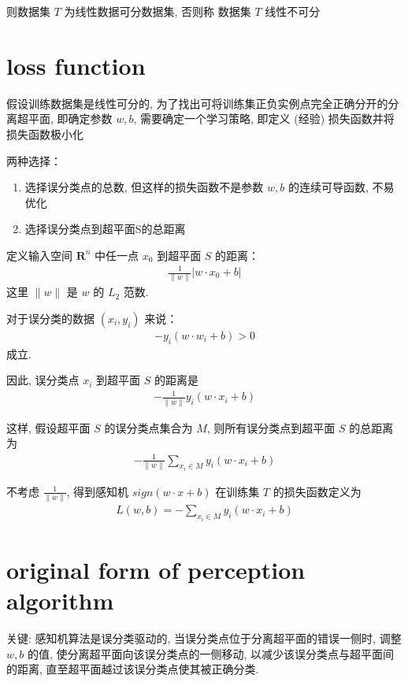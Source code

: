 \documentclass[oneside, 12pt]{ctexbook}
\begin{document}
			则数据集 $T$ 为线性数据可分数据集, 否则称 数据集 $T$ 线性不可分
	
		\section{\quad loss function}
			假设训练数据集是线性可分的, 为了找出可将训练集正负实例点完全正确分开的分离超平面, 即确定参数 $w, b$, 需要确定一个学习策略, 即定义 (经验) 损失函数并将损失函数极小化 
			
			两种选择：
			\begin{enumerate}
				\item 选择误分类点的总数, 但这样的损失函数不是参数 $w, b$ 的连续可导函数, 不易优化
				
				\item 选择误分类点到超平面S的总距离
			\end{enumerate}
		
			定义输入空间 $\boldsymbol{\text{R}}^n$ 中任一点 $x_0$ 到超平面 $S$ 的距离：
				\begin{align}
					\frac{1}{\parallel w \parallel} |w \cdot x_0 + b|
				\end{align}
			这里 $\parallel w \parallel$ 是 $w$ 的 $L_2$ 范数.
			
			对于误分类的数据 $(x_i, y_i)$ 来说：
				\begin{align}
					-y_i(w \cdot w_i + b) > 0
				\end{align}
			成立. 
			
			因此, 误分类点 $x_i$ 到超平面 $S$ 的距离是
				\begin{align}
					-\frac{1}{\parallel w \parallel} y_i (w \cdot x_i + b)
				\end{align}
			
			这样, 假设超平面 $S$ 的误分类点集合为 $M$, 则所有误分类点到超平面 $S$ 的总距离为 
				\begin{align}
					-\frac{1}{\parallel w \parallel} \sum_{x_i \in M} y_i (w \cdot x_i + b)
				\end{align}
				
			不考虑 $\frac{1}{\parallel w \parallel}$, 得到感知机 $sign(w \cdot x + b)$ 在训练集 $T$ 的损失函数定义为
				\begin{align}
					L(w, b) = -\sum_{x_i \in M} y_i (w \cdot x_i + b)
				\end{align}
				
		\section{\quad original form of perception algorithm}
			关键: 感知机算法是误分类驱动的, 当误分类点位于分离超平面的错误一侧时, 调整 $w, b$ 的值, 使分离超平面向该误分类点的一侧移动, 以减少该误分类点与超平面间的距离, 直至超平面越过该误分类点使其被正确分类.\\
			
\end{document}
